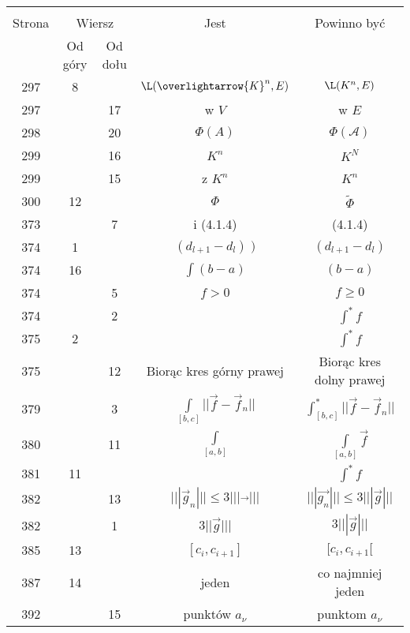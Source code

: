 \documentclass[a4paper,11pt]{article}
\newcommand{\ola}{\overlightarrow}
\begin{document}
\begin{center}
  \begin{tabular}{|c|c|c|c|c|}
    \hline
    & \multicolumn{2}{c|}{} & & \\
    Strona & \multicolumn{2}{c|}{Wiersz}& Jest & Powinno być \\ \cline{2-3}
    & Od góry & Od dołu &  &  \\ \hline
    297 &  8 & & $\L( \ola{ K }^{ n }, E )$ & $\L( K^{ n }, E )$ \\
    297 & & 17 & w $V$ & w $E$ \\
    298 & & 20 & $\Phi( A )$ & $\Phi( \mathcal{A} )$ \\
    299 & & 16 & $K^{ n }$ & $K^{ N }$ \\
    299 & & 15 & z $K^{ n }$ & $K^{ n }$ \\
    300 & 12 & & $\Phi$ & $\tilde{ \Phi }$ \\
    373 & &  7 & i (4.1.4) & (4.1.4) \\
    374 &  1 & & $( d_{ l + 1 } - d_{ l } )\; )$
           & $( d_{ l + 1 } - d_{ l } )$ \\
    374 & 16 & & $\int ( b - a )$ & $( b - a )$ \\
    374 & &  5 & $f > 0$ & $f \geq 0$ \\
    374 & &  2 & & $\int^{ * } \! f$ \\
    375 &  2 & & & $\int^{ * } \! f$ \\
    375 & & 12 & Biorąc kres górny prawej & Biorąc kres dolny prawej \\
    379 & &  3 & $\int\limits_{ [ b, c ]  } || \vec{ f }
                 - \vec{ f }_{ n } ||$
           & $\int^{ * }_{ [ b, c ]  } || \vec{ f } - \vec{ f }_{ n } ||$ \\
    380 & & 11 & $\int\limits_{ [ a, b ] }$ & $\int\limits_{ [ a, b ] }
                                              \vec{ f } $ \\
    381 & 11 & & & $\int^{ * } \! f$ \\
    382 & & 13 & $||| \vec g_{ n } ||| \leq 3 ||| \vec{ \; \; } |||$
           & $||| \vec{ g_{ n } } ||| \leq 3 ||| \vec{ g } |||$ \\
    382 & &  1 & $3 || \vec{ g } |||$ & $3 ||| \vec{ g } |||$ \\
    385 & 13 & & $[ c_{ i }, c_{ i + 1} ]$ & $[ c_{ i }, c_{ i + 1} [$ \\
    387 & 14 & & jeden & co najmniej jeden \\
    392 & & 15 & punktów $a_{ \nu }$ & punktom $a_{ \nu }$ \\
    \hline
  \end{tabular}


\end{center}
\end{document}
